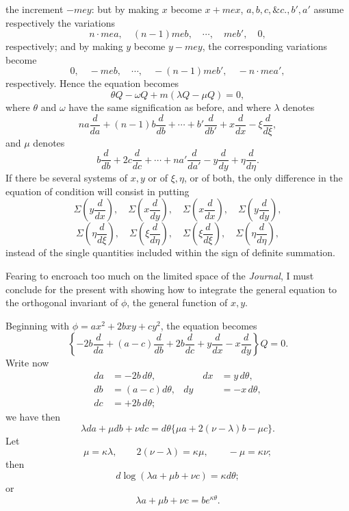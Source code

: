 \documentclass[11pt]{article}
\newcommand{\sourcepage}[1]{\marginpar{\scriptsize p.~#1}}
\begin{document}
\sourcepage{358}
the increment $-mey$: but by making $x$ become $x+mex$, $a,b,c,\&c.,b',a'$ assume respectively the variations
\[
n\cdot mea,
\quad (n-1)meb,
\quad \cdots,
\quad meb',
\quad 0,
\]
respectively; and by making $y$ become $y-mey$, the corresponding variations become
\[
0,
\quad -meb,
\quad \cdots,
\quad -(n-1)meb',
\quad -n\cdot mea',
\]
respectively. Hence the equation becomes
\[
\theta Q-\omega Q+m(\lambda Q-\mu Q)=0,
\]
where $\theta$ and $\omega$ have the same signification as before, and where $\lambda$ denotes
\[
na\frac{d}{da}+(n-1)b\frac{d}{db}+\cdots+b'\frac{d}{db'}+x\frac{d}{dx}-\xi\frac{d}{d\xi},
\]
and $\mu$ denotes
\[
b\frac{d}{db}+2c\frac{d}{dc}+\cdots+na'\frac{d}{da'}-y\frac{d}{dy}+\eta\frac{d}{d\eta}.
\]
If there be several systems of $x,y$ or of $\xi,\eta$, or of both, the only difference in the equation of condition will consist in putting
\[
\Sigma\left(y\frac{d}{dx}\right),\quad
\Sigma\left(x\frac{d}{dy}\right),\quad
\Sigma\left(x\frac{d}{dx}\right),\quad
\Sigma\left(y\frac{d}{dy}\right),
\]
\[
\Sigma\left(\eta\frac{d}{d\xi}\right),\quad
\Sigma\left(\xi\frac{d}{d\eta}\right),\quad
\Sigma\left(\xi\frac{d}{d\xi}\right),\quad
\Sigma\left(\eta\frac{d}{d\eta}\right),
\]
instead of the single quantities included within the sign of definite summation.

Fearing to encroach too much on the limited space of the \emph{Journal}, I must conclude for the present with showing how to integrate the general equation to the orthogonal invariant of $\phi$, the general function of $x,y$.

Beginning with $\phi=ax^2+2bxy+cy^2$, the equation becomes
\[
\left\{-2b\frac{d}{da}+(a-c)\frac{d}{db}+2b\frac{d}{dc}+y\frac{d}{dx}-x\frac{d}{dy}\right\}Q=0.
\]
Write now
\[
\begin{aligned}
da&=-2b\,d\theta,&\qquad dx&=y\,d\theta,\\
db&=(a-c)d\theta,& dy&=-x\,d\theta,\\
dc&=+2b\,d\theta;
\end{aligned}
\]
we have then
\[
\lambda da+\mu db+\nu dc=d\theta\{\mu a+2(\nu-\lambda)b-\mu c\}.
\]
Let
\[
\mu=\kappa\lambda,
\qquad 2(\nu-\lambda)=\kappa\mu,
\qquad -\mu=\kappa\nu;
\]
then
\[
d\log(\lambda a+\mu b+\nu c)=\kappa d\theta;
\]
or
\[
\lambda a+\mu b+\nu c=be^{\kappa\theta}.
\]
\end{document}
